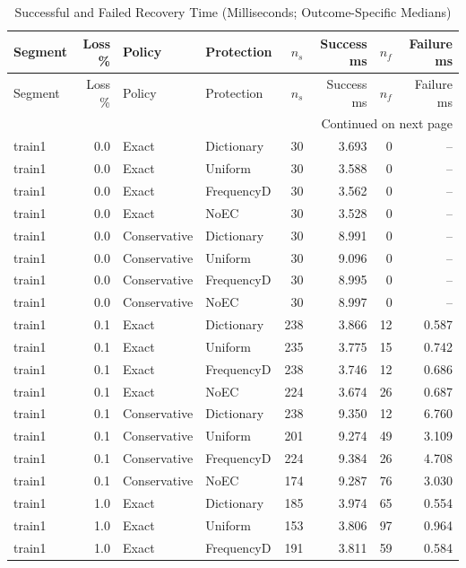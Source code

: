 \begingroup\small\setlength{\tabcolsep}{5pt}
\begin{longtable}{@{}lrllrrrr@{}}
\caption{Successful and Failed Recovery Time (Milliseconds; Outcome-Specific Medians)}\label{tab:key-c3-time}\\
\toprule Segment & Loss \% & Policy & Protection & $n_s$ & Success ms & $n_f$ & Failure ms\\\midrule\endfirsthead
\toprule Segment & Loss \% & Policy & Protection & $n_s$ & Success ms & $n_f$ & Failure ms\\\midrule\endhead
\midrule\multicolumn{8}{r}{Continued on next page}\\\endfoot
\bottomrule\endlastfoot
train1 & 0.0 & Exact & Dictionary & 30 & 3.693 & 0 & --\\
train1 & 0.0 & Exact & Uniform & 30 & 3.588 & 0 & --\\
train1 & 0.0 & Exact & FrequencyD & 30 & 3.562 & 0 & --\\
train1 & 0.0 & Exact & NoEC & 30 & 3.528 & 0 & --\\
train1 & 0.0 & Conservative & Dictionary & 30 & 8.991 & 0 & --\\
train1 & 0.0 & Conservative & Uniform & 30 & 9.096 & 0 & --\\
train1 & 0.0 & Conservative & FrequencyD & 30 & 8.995 & 0 & --\\
train1 & 0.0 & Conservative & NoEC & 30 & 8.997 & 0 & --\\
train1 & 0.1 & Exact & Dictionary & 238 & 3.866 & 12 & 0.587\\
train1 & 0.1 & Exact & Uniform & 235 & 3.775 & 15 & 0.742\\
train1 & 0.1 & Exact & FrequencyD & 238 & 3.746 & 12 & 0.686\\
train1 & 0.1 & Exact & NoEC & 224 & 3.674 & 26 & 0.687\\
train1 & 0.1 & Conservative & Dictionary & 238 & 9.350 & 12 & 6.760\\
train1 & 0.1 & Conservative & Uniform & 201 & 9.274 & 49 & 3.109\\
train1 & 0.1 & Conservative & FrequencyD & 224 & 9.384 & 26 & 4.708\\
train1 & 0.1 & Conservative & NoEC & 174 & 9.287 & 76 & 3.030\\
train1 & 1.0 & Exact & Dictionary & 185 & 3.974 & 65 & 0.554\\
train1 & 1.0 & Exact & Uniform & 153 & 3.806 & 97 & 0.964\\
train1 & 1.0 & Exact & FrequencyD & 191 & 3.811 & 59 & 0.584\\

\end{longtable}
